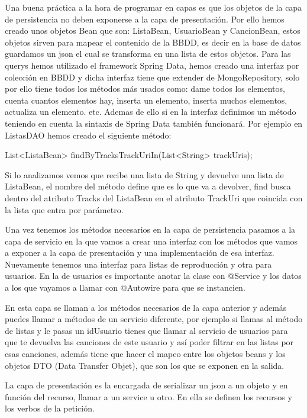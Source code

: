 \documentclass[12pt]{report} %
\begin{document}
 Una buena práctica a la hora de programar en capas es que los objetos de la capa de persistencia no deben exponerse a la capa de presentación. Por ello hemos creado unos objetos Bean que son: ListaBean, UsuarioBean y CancionBean, estos objetos sirven para mapear el contenido de la BBDD, es decir en la base de datos guardamos un json el cual se transforma en una lista de estos objetos.
 Para las querys hemos utilizado el framework Spring Data, hemos creado una interfaz por colección en BBDD y dicha interfaz tiene que extender de MongoRepository, solo por ello tiene todos los métodos más usados como: dame todos los elementos, cuenta cuantos elementos hay, inserta un elemento, inserta muchos elementos, actualiza un elemento. etc. Ademas de ello si en la interfaz definimos un método teniendo en cuenta la sintaxis de Spring Data también funcionará. Por ejemplo en ListasDAO hemos creado el siguiente método:
 
 	List<ListaBean> findByTracksTrackUriIn(List<String> trackUris);
 
 Si lo analizamos vemos que recibe una lista de String y devuelve una lista de ListaBean, el nombre del método define que es lo que va a devolver, find busca dentro del atributo Tracks del ListaBean en el atributo TrackUri que coincida con la lista que entra por parámetro.
 
 Una vez tenemos los métodos necesarios en la capa de persistencia pasamos a la capa de servicio en la que vamos a crear una interfaz con los métodos que vamos a exponer a la capa de presentación y una implementación de esa interfaz. Nuevamente tenemos una interfaz para listas de reproducción y otra para usuarios. En la de usuarios es importante anotar la clase con @Service y los datos a los que vayamos a llamar con @Autowire para que se instancien.
 
 En esta capa se llaman a los métodos necesarios de la capa anterior y además puedes llamar a métodos de un servicio diferente, por ejemplo si llamas al método de listas y le pasas un idUsuario tienes que  llamar al servicio de usuarios para que te devuelva las canciones de este usuario y así poder filtrar en las listas por esas canciones, además tiene que hacer el mapeo entre los objetos beans y los objetos DTO (Data Transfer Objet), que son los que se exponen en la salida.
 
 La capa de presentación es la encargada de serializar un json a un objeto y en función del recurso, llamar a un service u otro. En ella se definen los recursos y los verbos de la petición. 
 
\end{document}
